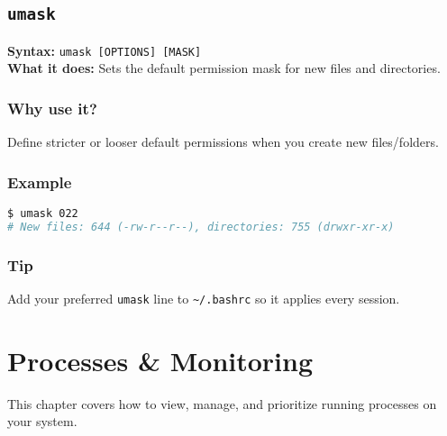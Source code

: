 \documentclass[10pt,oneside]{scrbook}
\begin{document}
\section{\texttt{umask}}
\begin{cmdbox}
  \textbf{Syntax:} \lstinline!umask [OPTIONS] [MASK]! \\
  \textbf{What it does:} Sets the default permission mask for new files and directories.
\end{cmdbox}
\begin{commanddetails}
  \subsection*{Why use it?}
    Define stricter or looser default permissions when you create new files/folders.

  \subsection*{Example}
  \begin{lstlisting}[language=bash]
$ umask 022
# New files: 644 (-rw-r--r--), directories: 755 (drwxr-xr-x)
  \end{lstlisting}

  \subsection*{Tip}
    Add your preferred \lstinline!umask! line to \lstinline!~/.bashrc! so it applies every session.
\end{commanddetails}
\chapter{Processes \& Monitoring}

This chapter covers how to view, manage, and prioritize running processes on your system.

\end{document}
